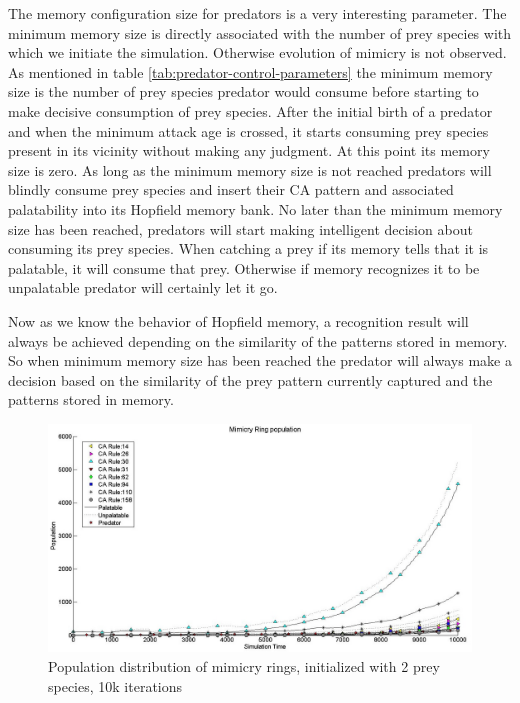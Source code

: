 The memory configuration size for predators is a very interesting parameter. The minimum memory size is directly associated with the number of prey species with which we initiate the simulation. Otherwise evolution of mimicry is not observed. As mentioned in table \ref{tab:predator-control-parameters} the minimum memory size is the number of prey species predator would consume before starting to make decisive consumption of prey species. After the initial birth of a predator and when the minimum attack age is crossed, it starts consuming prey species present in its vicinity without making any judgment. At this point its memory size is zero. As long as the minimum memory size is not reached predators will blindly consume prey species and insert their CA pattern and associated palatability into its Hopfield memory bank. No later than the minimum memory size has been reached, predators will start making intelligent decision about consuming its prey species. When catching a prey if its memory tells that it is palatable, it will consume that prey. Otherwise if memory recognizes it to be unpalatable predator will certainly let it go.

Now as we know the behavior of Hopfield memory, a recognition result will always be achieved depending on the similarity of the patterns stored in memory. So when minimum memory size has been reached the predator will always make a decision based on the similarity of the prey pattern currently captured and the patterns stored in memory.

\begin{figure}[H]
	\centering
	\includegraphics[scale=0.40]{images/simTime10k-2Prey}
	\caption[Population distribution of mimicry rings (2 prey species, 10k iterations)]{Population distribution of mimicry rings, initialized with 2 prey species, 10k iterations}
	\label{fig:plot-2-prey}
\end{figure}

